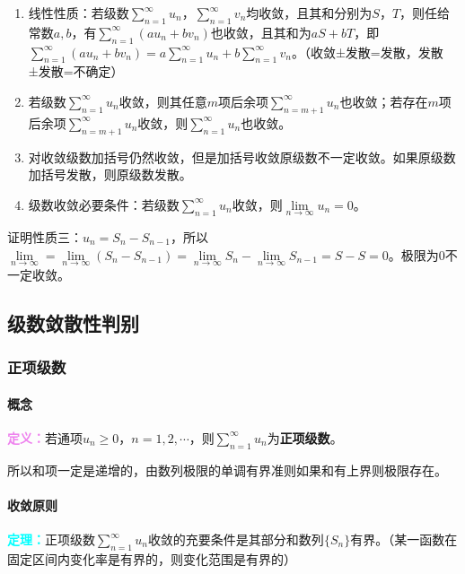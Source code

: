 \documentclass[UTF8, 12pt]{ctexart}
\begin{document}
\begin{enumerate}
    \item 线性性质：若级数$\sum\limits_{n=1}^\infty u_n$，$\sum\limits_{n=1}^\infty v_n$均收敛，且其和分别为$S$，$T$，则任给常数$a,b$，有$\sum\limits_{n=1}^\infty(au_n+bv_n)$也收敛，且其和为$aS+bT$，即$\sum\limits_{n=1}^\infty(au_n+bv_n)=a\sum\limits_{n=1}^\infty u_n+b\sum\limits_{n=1}^\infty v_n$。（收敛±发散=发散，发散±发散=不确定）
    \item 若级数$\sum\limits_{n=1}^\infty u_n$收敛，则其任意$m$项后余项$\sum\limits_{n=m+1}^\infty u_n$也收敛；若存在$m$项后余项$\sum\limits_{n=m+1}^\infty u_n$收敛，则$\sum\limits_{n=1}^\infty u_n$也收敛。
    \item 对收敛级数加括号仍然收敛，但是加括号收敛原级数不一定收敛。如果原级数加括号发散，则原级数发散。
    \item 级数收敛必要条件：若级数$\sum\limits_{n=1}^\infty u_n$收敛，则$\lim\limits_{n\to\infty}u_n=0$。
\end{enumerate}

证明性质三：$u_n=S_n-S_{n-1}$，所以$\lim\limits_{n\to\infty}=\lim\limits_{n\to\infty}(S_n-S_{n-1})=\lim\limits_{n\to\infty}S_n-\lim\limits_{n\to\infty}S_{n-1}=S-S=0$。极限为0不一定收敛。

\subsection{级数敛散性判别}

\subsubsection{正项级数}

\paragraph{概念} \leavevmode \medskip

\textcolor{violet}{\textbf{定义：}}若通项$u_n\geqslant0$，$n=1,2,\cdots$，则$\sum\limits_{n=1}^\infty u_n$为\textbf{正项级数}。

所以和项一定是递增的，由数列极限的单调有界准则如果和有上界则极限存在。

\paragraph{收敛原则} \leavevmode \medskip

\textcolor{aqua}{\textbf{定理：}}正项级数$\sum\limits_{n=1}^\infty u_n$收敛的充要条件是其部分和数列$\{S_n\}$有界。（某一函数在固定区间内变化率是有界的，则变化范围是有界的）
\end{document}
